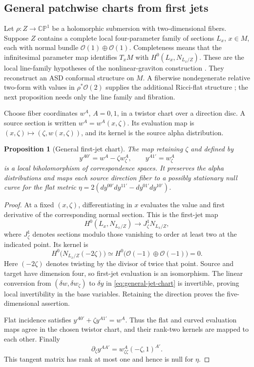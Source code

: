 \documentclass[11pt]{article}
\numberwithin{equation}{section}
\newtheorem{proposition}[theorem]{Proposition}
\theoremstyle{definition}
\theoremstyle{remark}
\newcommand{\CP}{\mathbb{CP}}
\newcommand{\OO}{\mathcal O}
\begin{document}
\subsection{General patchwise charts from first jets}

Let $\rho:Z\to\CP^1$ be a holomorphic submersion with two-dimensional fibers. Suppose $Z$ contains a complete local four-parameter family of sections $L_x$, $x\in M$, each with normal bundle $\OO(1)\oplus\OO(1)$. Completeness means that the infinitesimal parameter map identifies $T_xM$ with $H^0(L_x,N_{L_x/Z})$. These are the local line-family hypotheses of the nonlinear-graviton construction \cite{Penrose,Kodaira}. They reconstruct an ASD conformal structure on $M$. A fiberwise nondegenerate relative two-form with values in $\rho^*\OO(2)$ supplies the additional Ricci-flat structure \cite{HKLR}; the next proposition needs only the line family and fibration.

Choose fiber coordinates $w^A$, $A=0,1$, in a twistor chart over a direction disc. A source section is written $w^A=w^A(x,\zeta)$. Its evaluation map is $(x,\zeta)\mapsto(\zeta,w(x,\zeta))$, and its kernel is the source alpha distribution.

\begin{proposition}[General first-jet chart]\label{prop:general-chart}
The map retaining $\zeta$ and defined by
\begin{equation}\label{eq:general-jet-chart}
y^{A0'}=w^A-\zeta w^A_\zeta,
\qquad y^{A1'}=w^A_\zeta
\end{equation}
is a local biholomorphism of correspondence spaces. It preserves the alpha distributions and maps each source direction fiber to a possibly stationary null curve for the flat metric $\eta=2(dy^{00'}dy^{11'}-dy^{01'}dy^{10'})$.
\end{proposition}
\begin{proof}
At a fixed $(x,\zeta)$, differentiating in $x$ evaluates the value and first derivative of the corresponding normal section. This is the first-jet map
\[
H^0(L_x,N_{L_x/Z})\longrightarrow J^1_\zeta N_{L_x/Z},
\]
where $J^1_\zeta$ denotes sections modulo those vanishing to order at least two at the indicated point. Its kernel is
\[
H^0\bigl(N_{L_x/Z}(-2\zeta)\bigr)
\simeq H^0\bigl(\OO(-1)\oplus\OO(-1)\bigr)=0.
\]
Here $(-2\zeta)$ denotes twisting by the divisor of twice that point. Source and target have dimension four, so first-jet evaluation is an isomorphism. The linear conversion from $(\delta w,\delta w_\zeta)$ to $\delta y$ in \eqref{eq:general-jet-chart} is invertible, proving local invertibility in the base variables. Retaining the direction proves the five-dimensional assertion.

Flat incidence satisfies $y^{A0'}+\zeta y^{A1'}=w^A$. Thus the flat and curved evaluation maps agree in the chosen twistor chart, and their rank-two kernels are mapped to each other. Finally
\[
\partial_\zeta y^{AA'}=w^A_{\zeta\zeta}(-\zeta,1)^{A'}.
\]
This tangent matrix has rank at most one and hence is null for $\eta$.
\end{proof}
\end{document}
